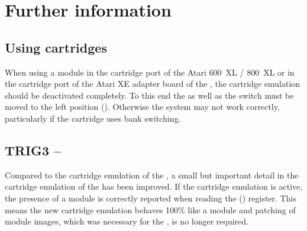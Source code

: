 \section{Further information}

\subsection{Using  cartridges}

When using a  module in the cartridge port of the Atari 600~XL / 800~XL
or in the cartridge port of the Atari XE adapter board of the \frz, the
cartridge emulation should be deactivated completely. To this end the
 as well as the   switch must be moved to the left
position (). Otherwise the system may not work correctly, particularly
if the cartridge uses bank switching.


\subsection{TRIG3 -- }

Compared to the cartridge emulation of the , a small but important
detail in the cartridge emulation of the  has been improved.
If the cartridge emulation is active, the presence of a module is correctly
reported when reading the  () register. This means the
new cartridge emulation behaves 100\% like a  module and patching
of module images, which was necessary for the , is no longer required.
